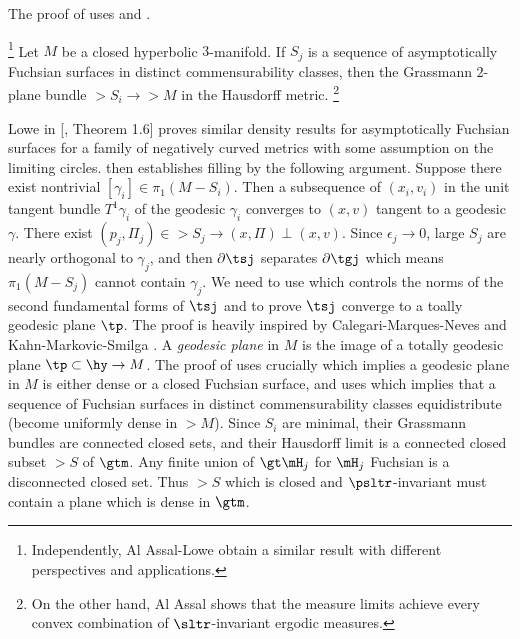 The proof of  uses  and . 
\begin{theorem}\footnote{Independently, Al Assal-Lowe \cite{flInprep} obtain a similar result with different perspectives and applications.}\label{limit of almost geodesic surfaces converge to dense subset}
	Let $M$ be a closed hyperbolic $3$-manifold. If $S_j$ is a sequence of asymptotically Fuchsian surfaces in distinct commensurability classes, then the Grassmann $2$-plane bundle $\gt S_i \rightarrow \gt M$ in the Hausdorff metric. \footnote{On the other hand, Al Assal \cite{afLimitsAsymptoticalFuchsian} shows that the measure limits achieve every convex combination of $\sltr$-invariant ergodic measures.}
\end{theorem}
Lowe in [, Theorem 1.6] proves similar density results for asymptotically Fuchsian surfaces for a family of negatively curved metrics with some assumption on the limiting circles.  then establishes filling by the following argument. Suppose there exist nontrivial $[\gamma_i]\in \pi_1(M-S_i)$. Then a subsequence of $(x_i,v_i) $ in the unit tangent bundle $T^1\gamma_i$ of the geodesic $\gamma_i$ converges to $(x,v)$ tangent to a geodesic $\gamma$. There exist $(p_j, \Pi_j) \in \gt S_j \rightarrow (x, \Pi)\perp (x,v)$. Since $\epsilon_j \rightarrow 0$, large $S_j$ are nearly orthogonal to $\gamma_j$, and then $\partial\tsj$ separates $\partial \tgj$ which means $\pi_1(M-S_j)$ cannot contain $\gamma_j$. We need to use \cite{saMinimalDiscsHyperbolicSpace} which controls the norms of the second fundamental forms of $\tsj$ and \cite{sgArzelaAscoliSubmanifolds} to prove $\tsj$ converge to a toally geodesic plane $\tp$. The proof is heavily inspired by Calegari-Marques-Neves \cite{cmnCountingminimal} and Kahn-Markovic-Smilga \cite{kmsGeometricallyTopologicallyRandomsurface}. A \textit{geodesic plane} in $M$ is the image of a totally geodesic plane $\tp \subset \hy \rightarrow M$. The proof of  uses crucially \cite{rmRatner'stheorem,snRatnerTheorem} which implies a geodesic plane in $M$ is either dense or a closed Fuchsian surface, and uses \cite{msErgodicInvariantMeasure} which implies that a sequence of Fuchsian surfaces in distinct commensurability classes equidistribute (become uniformly dense in $\gt M$). Since $S_i$ are minimal, their Grassmann bundles are connected closed sets, and their Hausdorff limit is a connected closed subset $\gt S$ of $\gtm$. Any finite union of $\gt \mH_j$ for $\mH_j$ Fuchsian is a disconnected closed set. Thus $\gt S$ which is closed and $\psltr$-invariant must contain a plane which is dense in $\gtm$. 
